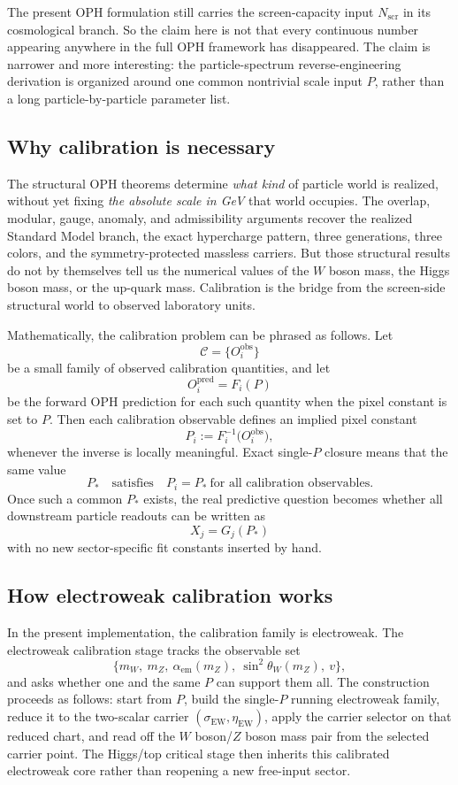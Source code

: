 \documentclass[11pt]{article}
\begin{document}
The present OPH formulation still carries the
screen-capacity input \(N_{\mathrm{scr}}\) in its cosmological branch. So the claim here is
not that every continuous number appearing anywhere in the full OPH framework has disappeared. The
claim is narrower and more interesting: the particle-spectrum reverse-engineering derivation is
organized around one common nontrivial scale input \(P\), rather than a long particle-by-particle
parameter list.

\subsection{Why calibration is necessary}

The structural OPH theorems determine \emph{what kind} of particle world is
realized, without yet fixing \emph{the absolute scale in GeV} that world occupies. The overlap,
modular, gauge, anomaly, and admissibility arguments recover the realized Standard Model branch,
the exact hypercharge pattern, three generations, three colors, and the symmetry-protected
massless carriers. But those structural results do not by themselves tell us the numerical values
of the \(W\) boson mass, the Higgs boson mass, or the up-quark mass. Calibration is the bridge
from the screen-side structural world to observed laboratory units.

Mathematically, the calibration problem can be phrased as follows. Let
\[
\mathcal C=\{O_i^{\mathrm{obs}}\}
\]
be a small family of observed calibration quantities, and let
\[
O_i^{\mathrm{pred}} = F_i(P)
\]
be the forward OPH prediction for each such quantity when the pixel constant is set to \(P\).
Then each calibration observable defines an implied pixel constant
\[
P_i := F_i^{-1}\!\bigl(O_i^{\mathrm{obs}}\bigr),
\]
whenever the inverse is locally meaningful. Exact single-\(P\) closure means that the same value
\[
P_* \quad \text{satisfies} \quad P_i=P_* \ \text{for all calibration observables}.
\]
Once such a common \(P_*\) exists, the real predictive question becomes whether all downstream
particle readouts can be written as
\[
X_j = G_j(P_*)
\]
with no new sector-specific fit constants inserted by hand.

\subsection{How electroweak calibration works}

In the present implementation, the calibration family is electroweak. The electroweak calibration
stage
tracks the observable set
\[
\{m_W,\ m_Z,\ \alpha_{\mathrm{em}}(m_Z),\ \sin^2\theta_W(m_Z),\ v\},
\]
and asks whether one and the same \(P\) can support them all. The construction proceeds as follows: start from \(P\), build the single-\(P\) running
electroweak family, reduce it to the two-scalar carrier \((\sigma_{\mathrm{EW}},
\eta_{\mathrm{EW}})\), apply the carrier selector on that reduced chart, and read off the
\(W\) boson/\(Z\) boson mass pair from the selected carrier point. The Higgs/top critical stage
then inherits this calibrated electroweak core rather than reopening a new
free-input sector.
\end{document}
